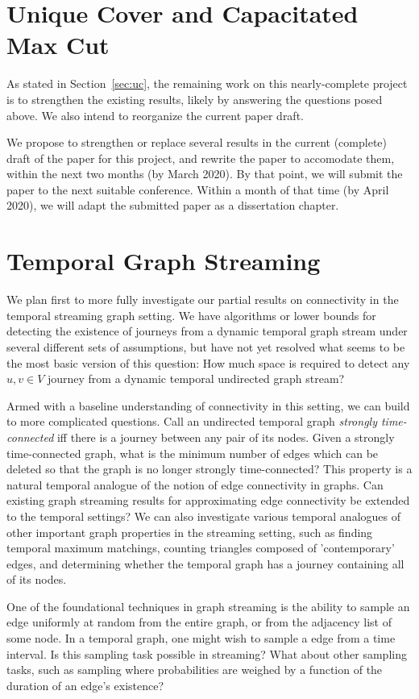 \section{Unique Cover and Capacitated Max Cut}
As stated in Section~\ref{sec:uc}, the remaining work on this nearly-complete project is to strengthen the existing results, likely by answering the questions posed above.  We also intend to reorganize the current paper draft.

We propose to strengthen or replace several results in the current (complete) draft of the paper for this project, and rewrite the paper to accomodate them, within the next two months (by March 2020).  By that point, we will submit the paper to the next suitable conference.  Within a month of that time (by April 2020), we will adapt the submitted paper as a dissertation chapter.

\section{Temporal Graph Streaming}
We plan first to more fully investigate our partial results on connectivity in the temporal streaming graph setting.  We have algorithms or lower bounds for detecting the existence of journeys from a dynamic temporal graph stream under several different sets of assumptions, but have not yet resolved what seems to be the most basic version of this question: How much space is required to detect any $u,v \in V$ journey from a dynamic temporal undirected graph stream?

Armed with a baseline understanding of connectivity in this setting, we can build to more complicated questions.  Call an undirected temporal graph \emph{strongly time-connected} iff there is a journey between any pair of its nodes.  Given a strongly time-connected graph, what is the minimum number of edges which can be deleted so that the graph is no longer strongly time-connected?  This property is a natural temporal analogue of the notion of edge connectivity in graphs.  Can existing graph streaming results for approximating edge connectivity be extended to the temporal settings?  We can also investigate various temporal analogues of other important graph properties in the streaming setting, such as finding temporal maximum matchings, counting triangles composed of 'contemporary' edges, and determining whether the temporal graph has a journey containing all of its nodes.

One of the foundational techniques in graph streaming is the ability to sample an edge uniformly at random from the entire graph, or from the adjacency list of some node.  In a temporal graph, one might wish to sample a edge from a time interval.  Is this sampling task possible in streaming?  What about other sampling tasks, such as sampling where probabilities are weighed by a function of the duration of an edge's existence?

